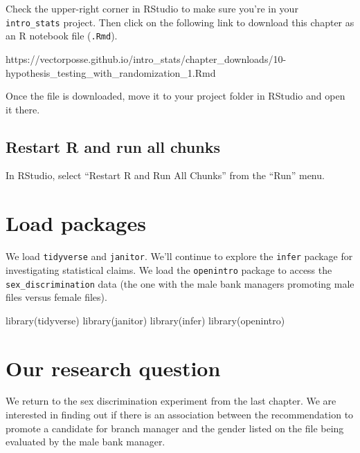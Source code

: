 \documentclass[
]{book}
\newenvironment{Shaded}{\begin{snugshade}}{\end{snugshade}}
\newcommand{\FunctionTok}[1]{\textcolor[rgb]{0.00,0.00,0.00}{#1}}
\newcommand{\NormalTok}[1]{#1}
\begin{document}
Check the upper-right corner in RStudio to make sure you're in your \texttt{intro\_stats} project. Then click on the following link to download this chapter as an R notebook file (\texttt{.Rmd}).

https://vectorposse.github.io/intro\_stats/chapter\_downloads/10-hypothesis\_testing\_with\_randomization\_1.Rmd

Once the file is downloaded, move it to your project folder in RStudio and open it there.

\hypertarget{hypothesis1-restart}{%
\subsection{Restart R and run all chunks}\label{hypothesis1-restart}}

In RStudio, select ``Restart R and Run All Chunks'' from the ``Run'' menu.

\hypertarget{hypothesis1-load}{%
\section{Load packages}\label{hypothesis1-load}}

We load \texttt{tidyverse} and \texttt{janitor}. We'll continue to explore the \texttt{infer} package for investigating statistical claims. We load the \texttt{openintro} package to access the \texttt{sex\_discrimination} data (the one with the male bank managers promoting male files versus female files).

\begin{Shaded}
\begin{Highlighting}[]
\FunctionTok{library}\NormalTok{(tidyverse)}
\FunctionTok{library}\NormalTok{(janitor)}
\FunctionTok{library}\NormalTok{(infer)}
\FunctionTok{library}\NormalTok{(openintro)}
\end{Highlighting}
\end{Shaded}

\hypertarget{hypothesis1-question}{%
\section{Our research question}\label{hypothesis1-question}}

We return to the sex discrimination experiment from the last chapter. We are interested in finding out if there is an association between the recommendation to promote a candidate for branch manager and the gender listed on the file being evaluated by the male bank manager.
\end{document}

